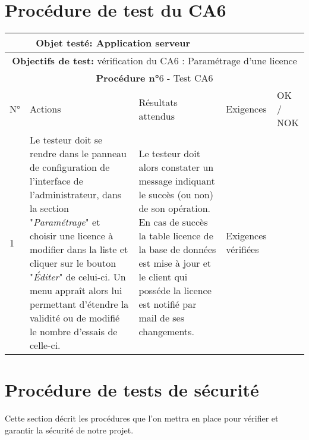 \section*{Procédure de test du CA6}
\begin{table}[!h]
        \centering
        \begin{tabular}{|m{0.6cm}|
                         >{\raggedright\arraybackslash}m{4cm}|
                         >{\raggedright\arraybackslash}m{6.4cm}|
                         >{\raggedright\arraybackslash}m{2cm}|
                         m{1cm}|}
            \hline
            \multicolumn{3}{|c|}{
                \textbf{Objet testé: } Application serveur
            } & \multicolumn{2}{|c|}{
                \textbf{Version: } version    
            } \\
            \hline
            \multicolumn{5}{|c|}{\textbf{Objectifs de test:} 
                vérification du CA6 : Paramétrage d'une licence} \\
            \hline
            \multicolumn{5}{|c|}{
                \textbf{Procédure n°}6 - Test CA6
            } \\
            \hline
            N° & Actions & Résultats attendus & Exigences & OK / NOK \\
            \hline      %
            1 & Le testeur doit se rendre dans le panneau de configuration
                de l'interface de l'administrateur, dans la section 
                "\emph{Paramétrage}" et choisir une licence à modifier
                dans la liste et cliquer sur le bouton "\emph{Éditer}" 
                de celui-ci. Un menu appraît alors lui permettant d'étendre
                la validité ou de modifié le nombre d'essais de celle-ci.
              & Le testeur doit alors constater un message indiquant le 
                succès (ou non) de son opération. En cas de succès la 
                table licence de la base de données est mise à jour et
                le client qui posséde la licence est notifié par mail de 
                ses changements. 
              & Exigences vérifiées & \\
            \hline
        \end{tabular} 
        \label{tab:tab6}
\end{table}
\newpage

\section{Procédure de tests de sécurité}
Cette section décrit les procédures que l'on mettra en place pour vérifier et garantir la
sécurité de notre projet.

